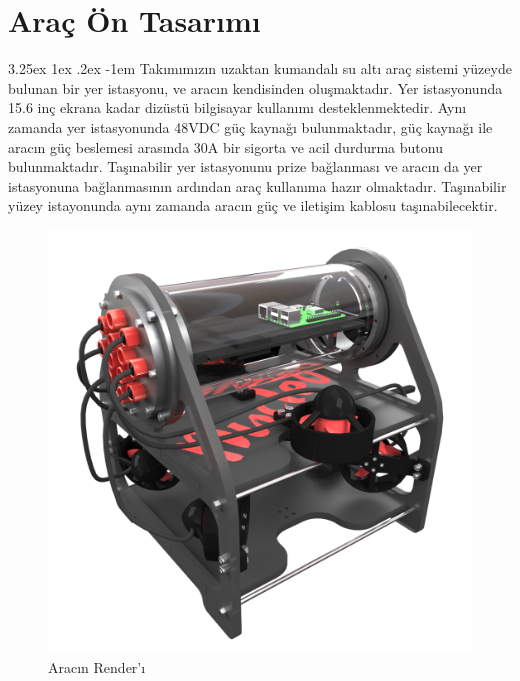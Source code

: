 \documentclass[12pt]{article}
\makeatletter
\renewcommand\paragraph{\@startsection{paragraph}{5}{\z@}%
  {3.25ex \@plus1ex \@minus.2ex}%
  {-1em}%
  {\normalfont\normalsize\bfseries}}
\makeatother
\begin{document}
\newpage

\section{Araç Ön Tasarımı}

\paragraph{} Takımımızın uzaktan kumandalı su altı araç sistemi yüzeyde bulunan bir yer istasyonu, ve aracın kendisinden oluşmaktadır. Yer istasyonunda 15.6 inç ekrana kadar dizüstü bilgisayar kullanımı desteklenmektedir. Aynı zamanda yer istasyonunda 48VDC güç kaynağı bulunmaktadır, güç kaynağı ile aracın güç beslemesi arasında 30A bir sigorta ve acil durdurma butonu bulunmaktadır. Taşınabilir yer istasyonunu prize bağlanması ve aracın da yer istasyonuna bağlanmasının ardından araç kullanıma hazır olmaktadır. Taşınabilir yüzey istayonunda aynı zamanda aracın güç ve iletişim kablosu taşınabilecektir.

\begin{figure}[hbt!]
\centering
\includegraphics[width=1\textwidth]{render.png}
\caption{Aracın Render'ı}
\label{fig:render}
\end{figure}

\newpage
\end{document}
